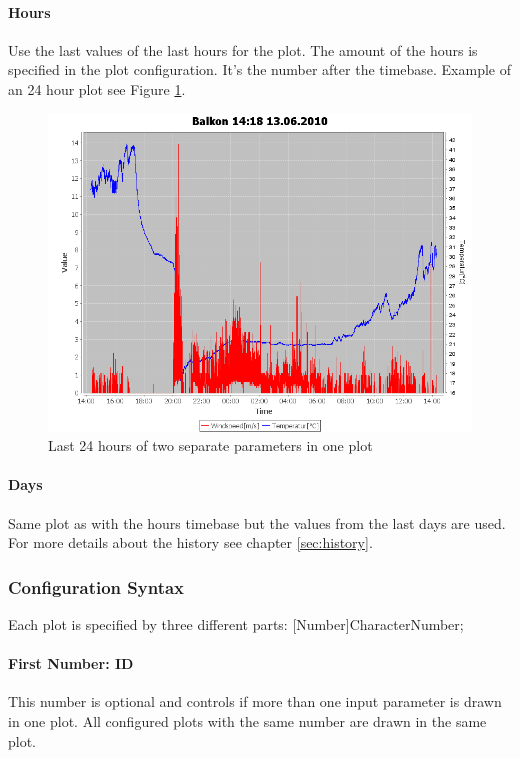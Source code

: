 \paragraph{Hours} %
\label{par:hours}
Use the last values of the last hours for the plot. The amount of the hours is specified in the plot configuration. It's the number after the timebase. Example of an 24 hour plot see Figure \ref{fig:hours}.
\begin{figure}[ht]
    \centering
    \includegraphics[width=0.9\linewidth]{master/plot_exampleh.png}
    \caption{Last 24 hours of two separate parameters in one plot}
    \label{fig:hours}
\end{figure}

\paragraph{Days} %
\label{par:days}
Same plot as with the hours timebase but the values from the last days are used. For more details about the history see chapter \ref{sec:history}.

\subsubsection{Configuration Syntax} %
\label{ssub:configuration_syntax}
Each plot is specified by three different parts: [Number]CharacterNumber;

\paragraph{First Number: ID} %
\label{par:first_number_id}
This number is optional and controls if more than one input parameter is drawn in one plot. All configured plots with the same number are drawn in the same plot.
